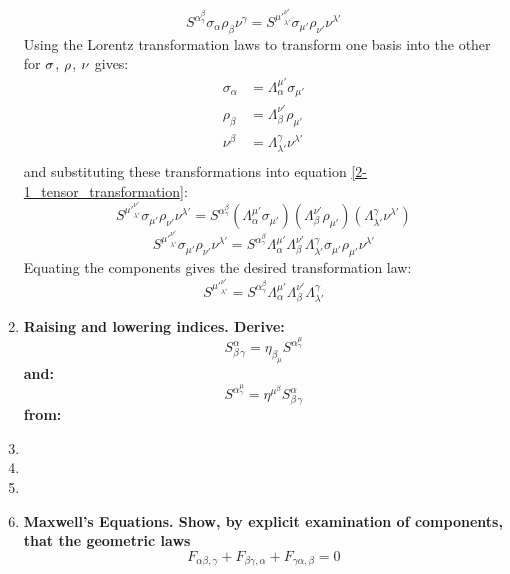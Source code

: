 \documentclass[9pt]{report}
\begin{document}
\begin{enumerate}
  \begin{equation}
    S^\alpha^\beta_\gamma \sigma_\alpha \rho_\beta \nu^\gamma = S^{\mu'}^{\nu'}_{\lambda'} \sigma_{\mu'} \rho_{\nu'} \nu^{\lambda'} \label{2-1_tensor_transformation}
  \end{equation}
  Using the Lorentz transformation laws to transform one basis into the other
  for $\bf{\sigma}$, $\bf{\rho}$, $\bf{\nu}$ gives:
  \[
  \begin{align}
    \sigma_\alpha &= \Lambda^{\mu'}_{\alpha} \sigma_{\mu'} \\
    \rho_\beta &= \Lambda^{\nu'}_{\beta} \rho_{\mu'} \\
    \nu^\beta &= \Lambda^{\gamma}_{\lambda'} \nu^{\lambda'} \\
  \end{align}
  \]
  and substituting these transformations into equation \ref{2-1_tensor_transformation}:
  \[
    S^{\mu'}^{\nu'}_{\lambda'} \sigma_{\mu'} \rho_{\nu'} \nu^{\lambda'} = S^\alpha^\beta_\gamma (\Lambda^{\mu'}_{\alpha} \sigma_{\mu'}) (\Lambda^{\nu'}_{\beta} \rho_{\mu'}) (\Lambda^{\gamma}_{\lambda'} \nu^{\lambda'})
  \]
  \[
    S^{\mu'}^{\nu'}_{\lambda'} \sigma_{\mu'} \rho_{\nu'} \nu^{\lambda'} = S^\alpha^\beta_\gamma \Lambda^{\mu'}_{\alpha} \Lambda^{\nu'}_{\beta} \Lambda^{\gamma}_{\lambda'} \sigma_{\mu'} \rho_{\mu'} \nu^{\lambda'}
  \]
  Equating the components gives the desired transformation law:
  \[
    S^{\mu'}^{\nu'}_{\lambda'} = S^\alpha^\beta_\gamma \Lambda^{\mu'}_{\alpha} \Lambda^{\nu'}_{\beta} \Lambda^{\gamma}_{\lambda'}
  \]
\item  \textbf{Raising and lowering indices. Derive:}
  \begin{equation}
    S^\alpha_\beta_\gamma = \eta_\beta_\mu S^\alpha^\mu_\gamma
  \end{equation}
  \textbf{and:}
  \begin{equation}
    S^\alpha^\mu_\gamma = \eta^\mu^\beta S^\alpha_\beta_\gamma
  \end{equation}
  \textbf{from:}
\item
\item
\item
\item
  \textbf{Maxwell's Equations. Show, by explicit examination of components, that
  the geometric laws}
  \begin{equation}
    F_{\alpha\beta,\gamma} + F_{\beta\gamma,\alpha} + F_{\gamma\alpha, \beta} = 0
  \end{equation}
  \begin{equation}

\end{equation}
\end{enumerate}
\end{document}
